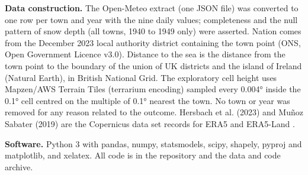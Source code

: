 \documentclass[11pt,a4paper]{article}
\begin{document}
\textbf{Data construction.} The Open-Meteo extract (one JSON file) was converted to one row per town and year with the nine daily values; completeness and the null pattern of snow depth (all towns, 1940 to 1949 only) were asserted. Nation comes from the December 2023 local authority district containing the town point (ONS, Open Government Licence v3.0). Distance to the sea is the distance from the town point to the boundary of the union of UK districts and the island of Ireland (Natural Earth), in British National Grid. The exploratory cell height uses Mapzen/AWS Terrain Tiles (terrarium encoding) sampled every 0.004° inside the 0.1° cell centred on the multiple of 0.1° nearest the town. No town or year was removed for any reason related to the outcome. Hersbach et al. (2023) and Muñoz Sabater (2019) are the Copernicus data set records for ERA5 and ERA5-Land \citep{hersbach2023,munoz2019}.

\textbf{Software.} Python 3 with pandas, numpy, statsmodels, scipy, shapely, pyproj and matplotlib, and xelatex. All code is in the repository and the data and code archive.
\end{document}

